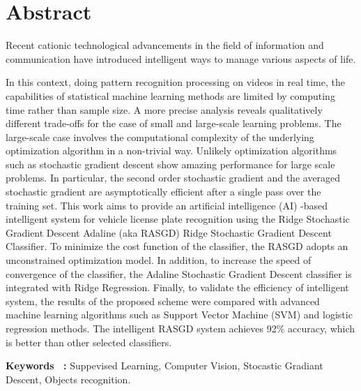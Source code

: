 \chapter*{Abstract}
	Recent cationic technological advancements in the field of information and communication have introduced intelligent ways to manage various aspects of life.
	
	In this context, doing pattern recognition processing on videos in real time, the capabilities of statistical machine learning methods are limited by computing time rather than sample size. A more precise analysis reveals qualitatively different trade-offs for the case of small and large-scale learning problems. The large-scale case involves the computational complexity of the underlying optimization algorithm in a non-trivial way. Unlikely optimization algorithms such as stochastic gradient descent show amazing performance for large scale problems. In particular, the second order stochastic gradient and the averaged stochastic gradient are asymptotically efficient after a single pass over the training set.
	This work aims to provide an artificial intelligence (AI) -based intelligent system for vehicle license plate recognition using the Ridge Stochastic Gradient Descent Adaline (aka RASGD) Ridge Stochastic Gradient Descent Classifier.
	To minimize the cost function of the classifier, the RASGD adopts an unconstrained optimization model. In addition, to increase the speed of convergence of the classifier, the Adaline Stochastic Gradient Descent classifier is integrated with Ridge Regression.
	Finally, to validate the efficiency of intelligent system, the results of the proposed scheme were compared with advanced machine learning algorithms such as Support Vector Machine (SVM) and logistic regression methods. The intelligent RASGD system achieves 92\% accuracy, which is better than other selected classifiers.
	
	\vspace{2 cm}

\begin{singlespace}
\textbf {Keywords ~:} Suppevised Learning, Computer Vision, Stocastic Gradiant Descent, Objects recognition.
\end{singlespace}

